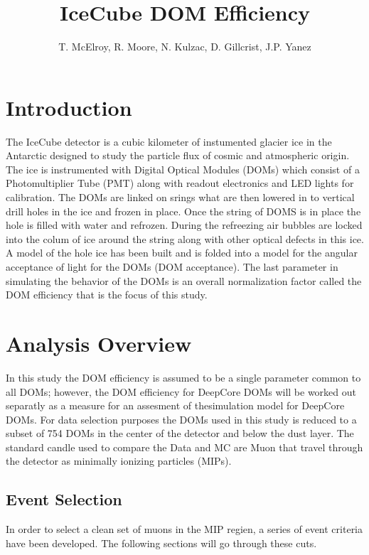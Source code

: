\documentclass[a4paper,onecolumn, 12pt]{article}
\begin{document}
\title{IceCube DOM Efficiency}

\author{T. McElroy, R. Moore, N. Kulzac, D. Gillcrist, J.P. Yanez}
\maketitle

\begin{abstract}

\end{abstract}

\section{Introduction}
The IceCube detector is a cubic kilometer of instumented glacier ice in the Antarctic designed to study the particle flux of cosmic and atmospheric origin. The ice is instrumented with Digital Optical Modules (DOMs) which consist of a Photomultiplier Tube (PMT) along with readout electronics and LED lights for calibration. The DOMs are linked on srings what are then lowered in to vertical drill holes in the ice and frozen in place. Once the string of DOMS is in place the hole is filled with water and refrozen. During the refreezing air bubbles are locked into the colum of ice around the string along with other optical defects in this ice. A model of the hole ice has been built and is folded into a model for the angular acceptance of light for the DOMs (DOM acceptance). The last parameter in simulating the behavior of the DOMs is an overall normalization factor called the DOM efficiency that is the focus of this study. 

\section{Analysis Overview}
In this study the DOM efficiency is assumed to be a single parameter common to all DOMs; however, the DOM efficiency for DeepCore DOMs will be worked out separatly as a measure for an assesment of thesimulation model for DeepCore DOMs. For data selection purposes the DOMs used in this study is reduced to a subset of 754 DOMs in the center of the detector and below the dust layer. The standard candle used to compare the Data and MC are Muon that travel through the detector as minimally ionizing particles (MIPs). 

\subsection{Event Selection}
In order to select a clean set of muons in the MIP regien, a series of event criteria have been developed. The following sections will go through these cuts. 
\end{document}
